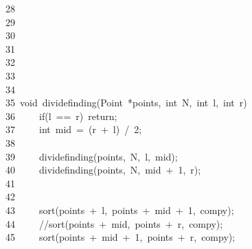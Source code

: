 \documentclass{article}
\newcommand{\hlstd}[1]{\textcolor[rgb]{0.2,0.2,0.2}{#1}}
\newcommand{\hlnum}[1]{\textcolor[rgb]{0.06,0.58,0.63}{#1}}
\newcommand{\hlslc}[1]{\textcolor[rgb]{0.59,0.59,0.59}{#1}}
\newcommand{\hlopt}[1]{\textcolor[rgb]{0.2,0.2,0.2}{#1}}
\newcommand{\hllin}[1]{\textcolor[rgb]{0.59,0.59,0.59}{#1}}
\newcommand{\hlkwa}[1]{\textcolor[rgb]{0.23,0.42,0.78}{#1}}
\newcommand{\hlkwb}[1]{\textcolor[rgb]{0.63,0,0.31}{#1}}
\newcommand{\hlkwd}[1]{\textcolor[rgb]{0.78,0.23,0.41}{#1}}
\begin{document}
	\hllin{28\ }\hlstd{}\hlstd{\ \ \ \ \ \ \ \ \ \ \ \ }\hlstd{}\hlopt{\usebox{\hlboxclosebrace}}\\
	\hllin{29\ }\hlstd{}\hlstd{\ \ \ \ \ \ \ \ }\hlstd{}\hlopt{\usebox{\hlboxclosebrace}}\\
	\hllin{30\ }\hlstd{}\hlstd{\ \ \ \ }\hlstd{}\hlopt{\usebox{\hlboxclosebrace}}\\
	\hllin{31\ }\hlstd{}\\
	\hllin{32\ }\hlstd{}\\
	\hllin{33\ }\hlstd{}\hlopt{\usebox{\hlboxclosebrace}}\\
	\hllin{34\ }\hlstd{}\\
	\hllin{35\ }\hlstd{}\hlkwb{void\ }\hlstd{}\hlkwd{divide\textunderscore finding}\hlstd{}\hlopt{(}\hlstd{Point\ }\hlopt{{*}}\hlstd{points}\hlopt{,\ }\hlstd{}\hlkwb{int\ }\hlstd{N}\hlopt{,\ }\hlstd{}\hlkwb{int\ }\hlstd{l}\hlopt{,\ }\hlstd{}\hlkwb{int\ }\hlstd{r}\hlopt{)\usebox{\hlboxopenbrace}}\\
	\hllin{36\ }\hlstd{}\hlstd{\ \ \ \ }\hlstd{}\hlkwa{if}\hlstd{}\hlopt{(}\hlstd{l\ }\hlopt{==\ }\hlstd{r}\hlopt{)\ }\hlstd{}\hlkwa{return}\hlstd{}\hlopt{;}\\
	\hllin{37\ }\hlstd{}\hlstd{\ \ \ \ }\hlstd{}\hlkwb{int\ }\hlstd{mid\ }\hlopt{=\ (}\hlstd{r\ }\hlopt{+\ }\hlstd{l}\hlopt{)\ /\ }\hlstd{}\hlnum{2}\hlstd{}\hlopt{;}\\
	\hllin{38\ }\hlstd{}\\
	\hllin{39\ }\hlstd{}\hlstd{\ \ \ \ }\hlstd{}\hlkwd{divide\textunderscore finding}\hlstd{}\hlopt{(}\hlstd{points}\hlopt{,\ }\hlstd{N}\hlopt{,\ }\hlstd{l}\hlopt{,\ }\hlstd{mid}\hlopt{);}\\
	\hllin{40\ }\hlstd{}\hlstd{\ \ \ \ }\hlstd{}\hlkwd{divide\textunderscore finding}\hlstd{}\hlopt{(}\hlstd{points}\hlopt{,\ }\hlstd{N}\hlopt{,\ }\hlstd{mid\ }\hlopt{+\ }\hlstd{}\hlnum{1}\hlstd{}\hlopt{,\ }\hlstd{r}\hlopt{);}\\
	\hllin{41\ }\hlstd{}\\
	\hllin{42\ }\hlstd{}\\
	\hllin{43\ }\hlstd{}\hlstd{\ \ \ \ }\hlstd{}\hlkwd{sort}\hlstd{}\hlopt{(}\hlstd{points\ }\hlopt{+\ }\hlstd{l}\hlopt{,\ }\hlstd{points\ }\hlopt{+\ }\hlstd{mid\ }\hlopt{+\ }\hlstd{}\hlnum{1}\hlstd{}\hlopt{,\ }\hlstd{comp\textunderscore y}\hlopt{);}\\
	\hllin{44\ }\hlstd{}\hlstd{\ \ \ \ }\hlstd{}\hlslc{//sort(points\ +\ mid,\ points\ +\ r,\ comp\textunderscore y);}\\
	\hllin{45\ }\hlstd{}\hlstd{\ \ \ \ }\hlstd{}\hlkwd{sort}\hlstd{}\hlopt{(}\hlstd{points\ }\hlopt{+\ }\hlstd{mid\ }\hlopt{+\ }\hlstd{}\hlnum{1}\hlstd{}\hlopt{,\ }\hlstd{points\ }\hlopt{+\ }\hlstd{r}\hlopt{,\ }\hlstd{comp\textunderscore y}\hlopt{);}\\
\end{document}
